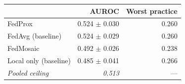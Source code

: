 \begin{tabular}{lrr}
    \toprule
    & AUROC & Worst practice \\
    \midrule
    FedProx & 0.524 $\pm$ 0.030 & 0.260 \\
    FedAvg (baseline) & 0.524 $\pm$ 0.029 & 0.260 \\
    FedMosaic & 0.492 $\pm$ 0.026 & 0.238 \\
    Local only (baseline) & 0.485 $\pm$ 0.041 & 0.266 \\
    \midrule
    \emph{Pooled ceiling} & \emph{0.513} & --- \\
    \bottomrule
\end{tabular}
